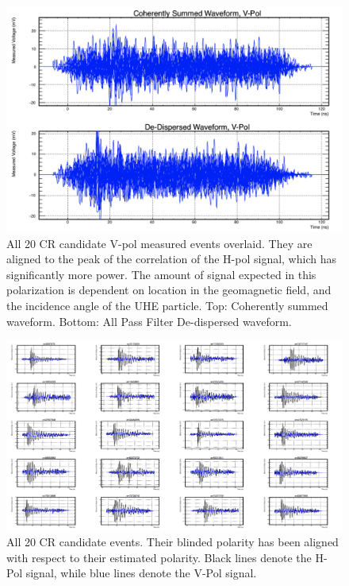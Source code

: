 		\begin{figure}
			\centering
				\includegraphics[width=\textwidth]{figures/vPolOverlay}
				\caption{All 20 CR candidate V-pol measured events overlaid.  They are aligned to the peak of the correlation of the H-pol signal, which has significantly more power.  The amount of signal expected in this polarization is dependent on location in the geomagnetic field, and the incidence angle of the UHE particle.  Top: Coherently summed waveform.  Bottom: All Pass Filter De-dispersed waveform. } 
			\label{fig:vPolOverlay}
		\end{figure}	
	
		\begin{figure}
			\centering
				\includegraphics[width=\textwidth]{figures/allCandidates_coherent}
				\caption{All 20 CR candidate events.  Their blinded polarity has been aligned with respect to their estimated polarity. Black lines denote the H-Pol signal, while blue lines denote the V-Pol signal. } 
			\label{fig:allCandidates_coherent}
		\end{figure}		
			
